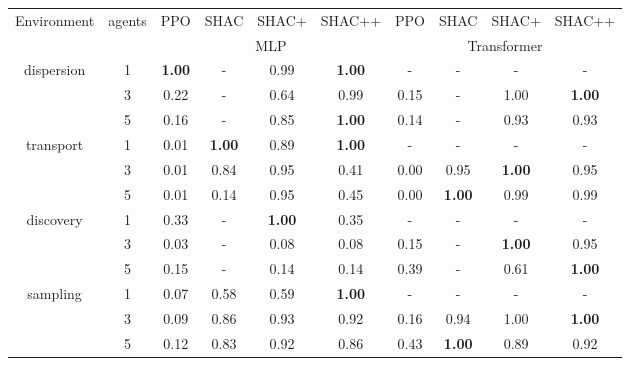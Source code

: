 \begin{tabular}{ c c c c c c c c c c }
\toprule
\multirow{2}{*}{Environment} & \multirow{2}{*}{agents} & PPO & SHAC & SHAC+ & SHAC++ & PPO & SHAC & SHAC+ & SHAC++ \\
 & & \multicolumn{4}{c}{MLP} & \multicolumn{4}{c}{Transformer} \\
\midrule
\multirow{3}{*}{dispersion}& 1 & \textbf{1.00} & - & 0.99 & \textbf{1.00} & - & - & - & - \\
& 3 & 0.22 & - & 0.64 & 0.99 & 0.15 & - & 1.00 & \textbf{1.00} \\
& 5 & 0.16 & - & 0.85 & \textbf{1.00} & 0.14 & - & 0.93 & 0.93 \\
\multirow{3}{*}{transport}& 1 & 0.01 & \textbf{1.00} & 0.89 & \textbf{1.00} & - & - & - & - \\
& 3 & 0.01 & 0.84 & 0.95 & 0.41 & 0.00 & 0.95 & \textbf{1.00} & 0.95 \\
& 5 & 0.01 & 0.14 & 0.95 & 0.45 & 0.00 & \textbf{1.00} & 0.99 & 0.99 \\
\multirow{3}{*}{discovery}& 1 & 0.33 & - & \textbf{1.00} & 0.35 & - & - & - & - \\
& 3 & 0.03 & - & 0.08 & 0.08 & 0.15 & - & \textbf{1.00} & 0.95 \\
& 5 & 0.15 & - & 0.14 & 0.14 & 0.39 & - & 0.61 & \textbf{1.00} \\
\multirow{3}{*}{sampling}& 1 & 0.07 & 0.58 & 0.59 & \textbf{1.00} & - & - & - & - \\
& 3 & 0.09 & 0.86 & 0.93 & 0.92 & 0.16 & 0.94 & 1.00 & \textbf{1.00} \\
& 5 & 0.12 & 0.83 & 0.92 & 0.86 & 0.43 & \textbf{1.00} & 0.89 & 0.92 \\
\bottomrule
\end{tabular}
